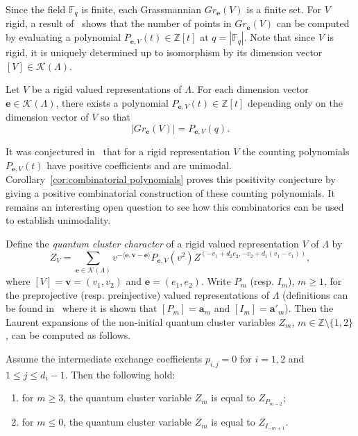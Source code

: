 \documentclass[ALCO,ThmDefs,Unicode,epreuves]{cedram}
\newcommand{\bfa}{\mathbf{a}}
\newcommand{\bfe}{\mathbf{e}}
\newcommand{\bfv}{\mathbf{v}}
\newcommand{\cK}{\mathcal{K}}
\newcommand{\FF}{\mathbb{F}}
\newcommand{\ZZ}{\mathbb{Z}}
\begin{document}
Since the field $\FF_q$ is finite, each Grassmannian $Gr_\bfe(V)$ is a finite set.
For $V$ rigid, a result of~\cite{rupel3} shows that the number of points in $Gr_\bfe(V)$ can be computed by evaluating a polynomial $P_{\bfe,V}(t)\in\ZZ[t]$ at $q=|\FF_q|$.
Note that since $V$ is rigid, it is uniquely determined up to isomorphism by its dimension vector $[V]\in\cK(\Lambda)$. 
\begin{theorem}
 Let $V$ be a rigid valued representations of $\Lambda$.
 For each dimension vector $\bfe\in\cK(\Lambda)$, there exists a polynomial $P_{\bfe,V}(t)\in\ZZ[t]$ depending only on the dimension vector of $V$ so that 
 \[|Gr_\bfe(V)|=P_{\bfe,V}(q).\]
\end{theorem}

It was conjectured in~\cite{rupel3} that for a rigid representation $V$ the counting polynomials $P_{\bfe,V}(t)$ have positive coefficients and are unimodal.
Corollary~\ref{cor:combinatorial polynomials} proves this positivity conjecture by giving a positive combinatorial construction of these counting polynomials.
It remains an interesting open question to see how this combinatorics can be used to establish unimodality.

Define the \emph{quantum cluster character} of a rigid valued representation $V$ of $\Lambda$ by
\[Z_V=\sum\limits_{\bfe\in\cK(\Lambda)} v^{-\langle\bfe,\bfv-\bfe\rangle}P_{\bfe,V}(v^2)Z^{(-v_1+d_2e_2,-v_2+d_1(v_1-e_1))},\]
where $[V]=\bfv=(v_1,v_2)$ and $\bfe=(e_1,e_2)$.
Write $P_m$ (resp. $I_m$), $m\ge1$, for the preprojective (resp. preinjective) valued representations of $\Lambda$ (definitions can be found in~\cite{rupel0} where it is shown that $[P_m]=\bfa_m$ and $[I_m]=\bfa'_m$).
Then the Laurent expansions of the non-initial quantum cluster variables $Z_m$, $m\in\ZZ\setminus\{1,2\}$, can be computed as follows.
\begin{theorem}
 \label{th:quantum categorification}
 Assume the intermediate exchange coefficients $p_{i,j}=0$ for $i=1,2$ and $1\le j\le d_i-1$. Then the following hold:
 \begin{enumerate}[label=(\alph*)]
 \item for $m\ge3$, the quantum cluster variable $Z_m$ is equal to $Z_{P_{m-2}}$;
 \item for $m\le0$, the quantum cluster variable $Z_m$ is equal to $Z_{I_{-m+1}}$.
 \end{enumerate}
\end{theorem}
\end{document}
